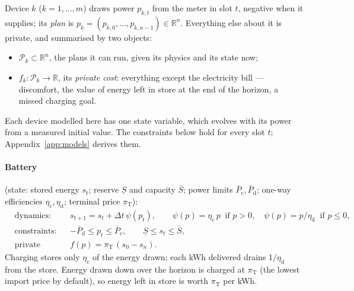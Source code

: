 \documentclass[11pt,a4paper]{article}
\newcommand{\R}{\mathbb{R}}
\newcommand{\Ec}{\eta_{\mathrm c}}
\newcommand{\Ed}{\eta_{\mathrm d}}
\newcommand{\dt}{\Delta t}
\newcommand{\Pk}{\mathcal P_k}
\begin{document}
Device $k$ ($k = 1,\dots,m$) draws power $p_{k,t}$ from the meter in slot $t$,
negative when it supplies; its \emph{plan} is $p_k = (p_{k,0},\dots,p_{k,n-1})
\in \R^n$. Everything else about it is private, and summarised by two objects:
\begin{itemize}[leftmargin=*,itemsep=1pt]
\item $\Pk \subset \R^n$, the plans it can run, given its physics and its state
  now;
\item $f_k : \Pk \to \R$, its \emph{private cost}: everything except the
  electricity bill --- discomfort, the value of energy left in store at the end
  of the horizon, a missed charging goal.
\end{itemize}
Each device modelled here has one state variable, which evolves with its power
from a measured initial value. The constraints below hold for every slot $t$;
Appendix~\ref{app:models} derives them.

\paragraph{Battery} (state: stored energy $s_t$; reserve $\underline S$ and
capacity $\bar S$; power limits $\bar P_{\mathrm c}, \bar P_{\mathrm d}$;
one-way efficiencies $\Ec, \Ed$; terminal price $\pi_{\mathrm T}$):
\begin{equation}
\begin{aligned}
  &\text{dynamics:}    && s_{t+1} = s_t + \dt\,\psi(p_t), \qquad
                          \psi(p) = \Ec\,p \ \text{ if } p > 0, \quad \psi(p) = p/\Ed \ \text{ if } p \le 0, \\
  &\text{constraints:} && -\bar P_{\mathrm d} \le p_t \le \bar P_{\mathrm c}, \qquad \underline S \le s_t \le \bar S, \\
  &\text{private cost:}&& f(p) = \pi_{\mathrm T}\,(s_0 - s_n).
\end{aligned}
\label{eq:battery}
\end{equation}
Charging stores only $\Ec$ of the energy drawn; each kWh delivered drains
$1/\Ed$ from the store. Energy drawn down over the horizon is charged at
$\pi_{\mathrm T}$ (the lowest import price by default), so energy left in store
is worth $\pi_{\mathrm T}$ per kWh.
\end{document}
